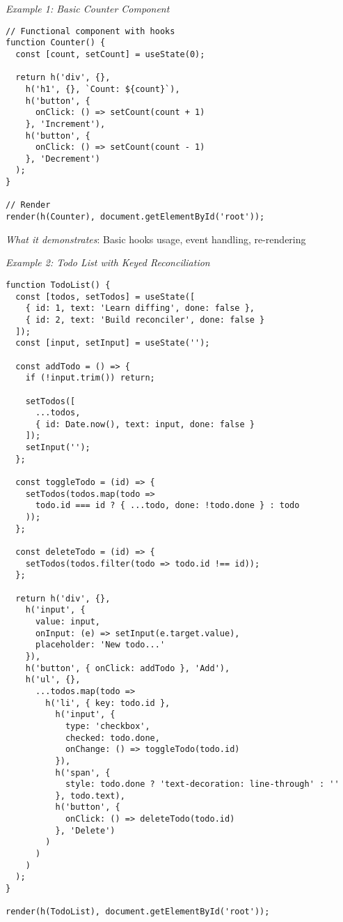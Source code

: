 \documentclass[11pt]{article}
\begin{document}
\emph{Example 1: Basic Counter Component}

\begin{verbatim}
// Functional component with hooks
function Counter() {
  const [count, setCount] = useState(0);
  
  return h('div', {},
    h('h1', {}, `Count: ${count}`),
    h('button', { 
      onClick: () => setCount(count + 1) 
    }, 'Increment'),
    h('button', { 
      onClick: () => setCount(count - 1) 
    }, 'Decrement')
  );
}

// Render
render(h(Counter), document.getElementById('root'));
\end{verbatim}

\emph{What it demonstrates}: Basic hooks usage, event handling, re-rendering

\emph{Example 2: Todo List with Keyed Reconciliation}

\begin{verbatim}
function TodoList() {
  const [todos, setTodos] = useState([
    { id: 1, text: 'Learn diffing', done: false },
    { id: 2, text: 'Build reconciler', done: false }
  ]);
  const [input, setInput] = useState('');
  
  const addTodo = () => {
    if (!input.trim()) return;
    
    setTodos([
      ...todos,
      { id: Date.now(), text: input, done: false }
    ]);
    setInput('');
  };
  
  const toggleTodo = (id) => {
    setTodos(todos.map(todo =>
      todo.id === id ? { ...todo, done: !todo.done } : todo
    ));
  };
  
  const deleteTodo = (id) => {
    setTodos(todos.filter(todo => todo.id !== id));
  };
  
  return h('div', {},
    h('input', {
      value: input,
      onInput: (e) => setInput(e.target.value),
      placeholder: 'New todo...'
    }),
    h('button', { onClick: addTodo }, 'Add'),
    h('ul', {},
      ...todos.map(todo =>
        h('li', { key: todo.id },
          h('input', {
            type: 'checkbox',
            checked: todo.done,
            onChange: () => toggleTodo(todo.id)
          }),
          h('span', {
            style: todo.done ? 'text-decoration: line-through' : ''
          }, todo.text),
          h('button', {
            onClick: () => deleteTodo(todo.id)
          }, 'Delete')
        )
      )
    )
  );
}

render(h(TodoList), document.getElementById('root'));
\end{verbatim}
\end{document}
